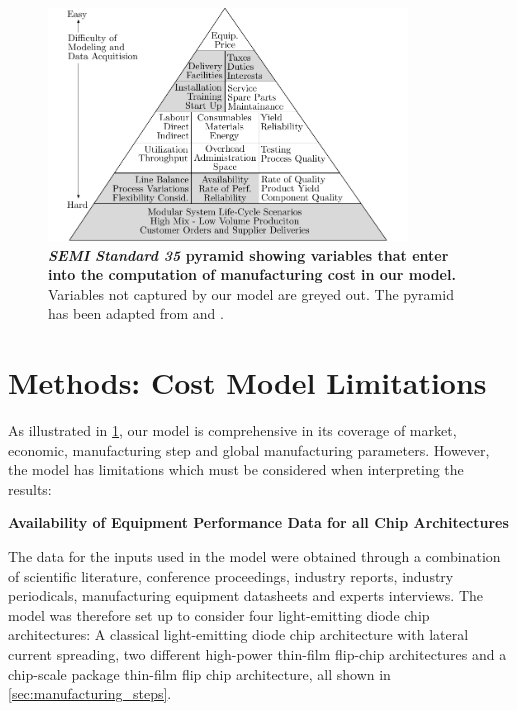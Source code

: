 \documentclass[parskip=full]{article}
\begin{document}
\begin{figure}[h!]
    \centering
    \includegraphics[width=0.85\textwidth]{./figures/SEMI_pyramid.pdf}
    \caption{\textbf{\textit{SEMI Standard 35} pyramid showing variables that enter into the computation of manufacturing cost in our model.} Variables not captured by our model are greyed out. The pyramid has been adapted from \cite{standardE35} and \cite{helin200618th}.}
    \label{fig:semi_pyramid}
    \vspace{-20mm}
\end{figure}

\clearpage
\section{Methods: Cost Model Limitations}
\label{sec:costmodel_limitations}

As illustrated in \cref{fig:semi_pyramid}, our model is comprehensive in its coverage of market, economic, manufacturing step and global manufacturing parameters. However, the model has limitations which must be considered when interpreting the results:

\textbf{Availability of Equipment Performance Data for all Chip Architectures}

The data for the inputs used in the model were obtained through a combination of scientific literature, conference proceedings, industry reports, industry periodicals, manufacturing equipment datasheets and experts interviews. The model was therefore set up to consider four light-emitting diode chip architectures: A classical light-emitting diode chip architecture with lateral current spreading, two diﬀerent high-power thin-ﬁlm ﬂip-chip architectures and a chip-scale package thin-ﬁlm ﬂip chip architecture, all shown in \cref{sec:manufacturing_steps}.
\end{document}
